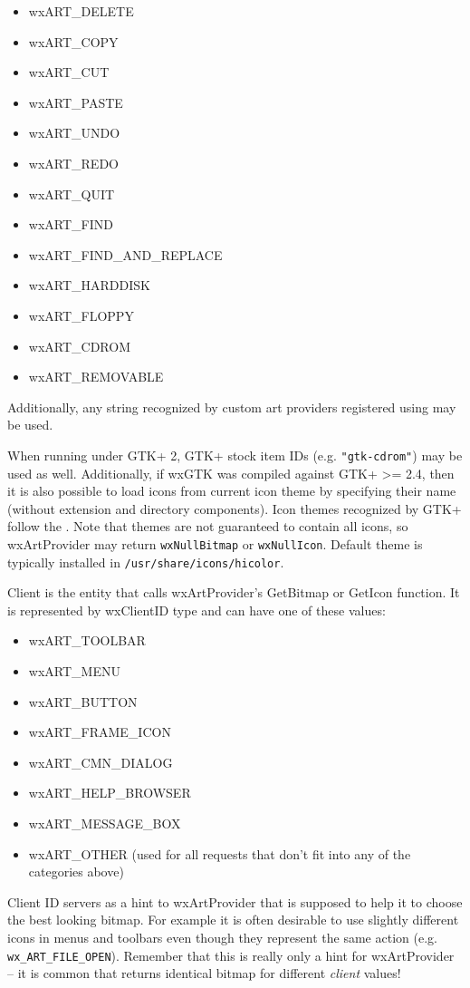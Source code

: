 \begin{itemize}
\item wxART\_DELETE
\item wxART\_COPY
\item wxART\_CUT
\item wxART\_PASTE
\item wxART\_UNDO
\item wxART\_REDO
\item wxART\_QUIT
\item wxART\_FIND
\item wxART\_FIND\_AND\_REPLACE
\item wxART\_HARDDISK
\item wxART\_FLOPPY
\item wxART\_CDROM
\item wxART\_REMOVABLE

\end{itemize}

Additionally, any string recognized by custom art providers registered using 
 may be used.


When running under GTK+ 2, GTK+ stock item IDs (e.g. {\tt "gtk-cdrom"}) may
be used as well. Additionally, if wxGTK was compiled against GTK+ >= 2.4, then
it is also possible to load icons from current icon theme by specifying their
name (without extension and directory components). Icon themes recognized
by GTK+ follow the
. Note that themes are not guaranteed to contain all
icons, so wxArtProvider may return {\tt wxNullBitmap} or {\tt wxNullIcon}.
Default theme is typically installed in {\tt /usr/share/icons/hicolor}.


\label{artproviderclients}

Client is the entity that calls wxArtProvider's GetBitmap or GetIcon
function. It is represented by wxClientID type and can have one of these 
values:
\begin{itemize}\itemsep=0pt
\item wxART\_TOOLBAR
\item wxART\_MENU
\item wxART\_BUTTON
\item wxART\_FRAME\_ICON
\item wxART\_CMN\_DIALOG
\item wxART\_HELP\_BROWSER
\item wxART\_MESSAGE\_BOX
\item wxART\_OTHER (used for all requests that don't fit into any of the categories above)
\end{itemize}
Client ID servers as a hint to wxArtProvider that is supposed to help it to
choose the best looking bitmap. For example it is often desirable to use
slightly different icons in menus and toolbars even though they represent the
same action (e.g. {\tt wx\_ART\_FILE\_OPEN}). Remember that this is really
only a hint for wxArtProvider -- it is common that
returns identical bitmap for different {\it client} values!

